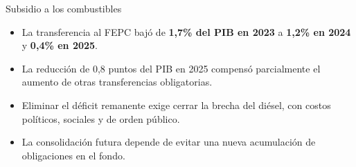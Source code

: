\begin{frame}{Subsidio a los combustibles}
\begin{itemize}
  \item La transferencia al FEPC bajó de \textbf{1,7\% del PIB en 2023} a \textbf{1,2\% en 2024} y \textbf{0,4\% en 2025}.
  \item La reducción de 0,8 puntos del PIB en 2025 compensó parcialmente el aumento de otras transferencias obligatorias.
  \item Eliminar el déficit remanente exige cerrar la brecha del diésel, con costos políticos, sociales y de orden público.
  \item La consolidación futura depende de evitar una nueva acumulación de obligaciones en el fondo.
\end{itemize}
\end{frame}